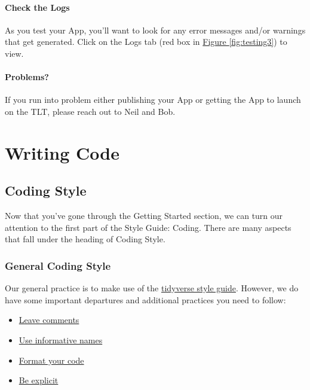 \documentclass[
]{book}
\providecommand{\tightlist}{%
  \setlength{\itemsep}{0pt}\setlength{\parskip}{0pt}}
\begin{document}
\hypertarget{check-the-logs}{%
\subsection{Check the Logs}\label{check-the-logs}}

As you test your App, you'll want to look for any error messages and/or warnings that get generated. Click on the Logs tab (red box in \protect\hyperlink{fig:testing3}{Figure \ref{fig:testing3}}) to view.

\hypertarget{problems}{%
\subsection{Problems?}\label{problems}}

If you run into problem either publishing your App or getting the App to launch on the TLT, please reach out to Neil and Bob.

\hypertarget{part-writing-code}{%
\part{Writing Code}\label{part-writing-code}}

\hypertarget{coding}{%
\chapter{Coding Style}\label{coding}}

Now that you've gone through the Getting Started section, we can turn our attention to the first part of the Style Guide: Coding. There are many aspects that fall under the heading of Coding Style.

\hypertarget{genCode}{%
\section{General Coding Style}\label{genCode}}

Our general practice is to make use of the \href{https://style.tidyverse.org/}{tidyverse style guide}. However, we do have some important departures and additional practices you need to follow:

\begin{itemize}
\tightlist
\item
  \protect\hyperlink{comments}{Leave comments}
\item
  \protect\hyperlink{naming}{Use informative names}
\item
  \protect\hyperlink{formatCode}{Format your code}
\item
  \protect\hyperlink{explicit}{Be explicit}
\end{itemize}
\end{document}

